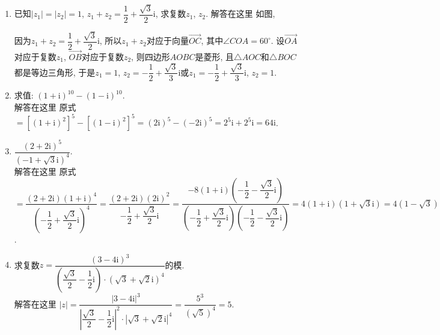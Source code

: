 \documentclass[10pt,a4paper]{article}
\begin{document}
\begin{enumerate}[1.]
\begin{center}
\end{center}
\item 已知$|z_1|=|z_2|=1$, $z_1+z_2=\dfrac 12+\dfrac{\sqrt 3}2\mathrm{i}$, 求复数$z_1$, $z_2$.
解答在这里  如图,
\begin{center}
\end{center}
因为$z_1+z_2=\dfrac 12+\dfrac{\sqrt 3}2\mathrm{i}$,
所以$z_1+z_2$对应于向量$\overrightarrow{OC}$, 其中$\angle COA=60^\circ$.
设$\overrightarrow{OA}$对应于复数$z_1$, $\overrightarrow{OB}$对应于复数$z_2$, 则四边形$AOBC$是菱形, 且$\triangle AOC$和$\triangle BOC$都是等边三角形, 于是$z_1=1$, $z_2=-\dfrac 12+\dfrac{\sqrt 3}3\mathrm{i}$或$z_1=-\dfrac 12+\dfrac{\sqrt 3}3\mathrm{i}$, $z_2=1$.
\item 求值: $(1+\mathrm{i})^{10}-(1-\mathrm{i})^{10}$.\\
解答在这里  原式$=[(1+\mathrm{i})^2]^5-[(1-\mathrm{i})^2]^5=(2\mathrm{i})^5-(-2\mathrm{i})^5=2^5\mathrm{i}+2^5\mathrm{i}=64\mathrm{i}$.
\item $\dfrac{{{(2+2\mathrm{i})}^5}}{{{(-1+\sqrt 3\mathrm{i})}^4}}$.\\
解答在这里 原式$=\dfrac{(2+2\mathrm{i}){{(1+\mathrm{i})}^4}}{{{(-\dfrac 12+\dfrac{\sqrt 3}2\mathrm{i})}^4}}=\dfrac{(2+2\mathrm{i}){{(2\mathrm{i})}^2}}{-\dfrac 12+\dfrac{\sqrt 3}2\mathrm{i}}=\dfrac{-8(1+\mathrm{i})(-\dfrac 12-\dfrac{\sqrt 3}2\mathrm{i})}{(-\dfrac 12+\dfrac{\sqrt 3}2\mathrm{i})(-\dfrac 12-\dfrac{\sqrt 3}2\mathrm{i})}=4(1+\mathrm{i})(1+\sqrt 3\mathrm{i})=4(1-\sqrt 3)+4(1+\sqrt 3)\mathrm{i}$.
\item 求复数$z=\dfrac{{{(3-4\mathrm{i})}^3}}{(\dfrac{\sqrt 3}2-\dfrac 12\mathrm{i})\cdot {{(\sqrt 3+\sqrt 2\mathrm{i})}^4}}$的模.\\
解答在这里  $|z|=\dfrac{{{|3-4\mathrm{i}|}^3}}{{{|\dfrac{\sqrt 3}2-\dfrac 12\mathrm{i}|}^2}\cdot {{|\sqrt 3+\sqrt 2\mathrm{i}|}^4}}=\dfrac{5^3}{{{(\sqrt 5)}^4}}=5$.

\end{enumerate}
\end{document}
